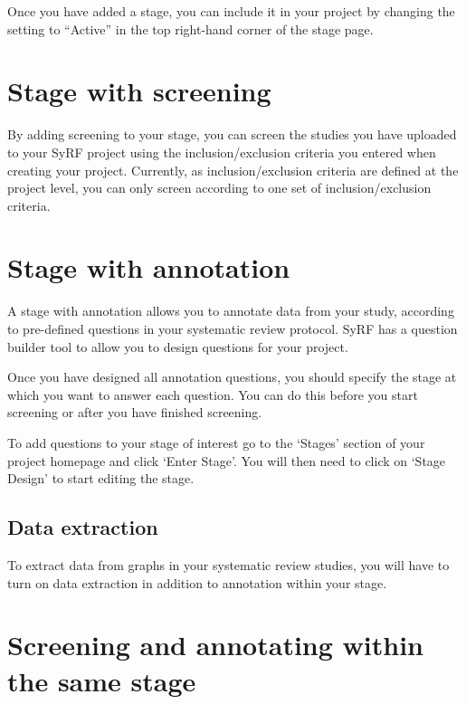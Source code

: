 \documentclass[
]{book}
\begin{document}
Once you have added a stage, you can include it in your project by changing the setting to ``Active'' in the top right-hand corner of the stage page.

\hypertarget{stage-with-screening}{%
\section{Stage with screening}\label{stage-with-screening}}

By adding screening to your stage, you can screen the studies you have uploaded to your SyRF project using the inclusion/exclusion criteria you entered when creating your project. Currently, as inclusion/exclusion criteria are defined at the project level, you can only screen according to one set of inclusion/exclusion criteria.

\hypertarget{stage-with-annotation}{%
\section{Stage with annotation}\label{stage-with-annotation}}

A stage with annotation allows you to annotate data from your study, according to pre-defined questions in your systematic review protocol. SyRF has a question builder tool to allow you to design questions for your project.

Once you have designed all annotation questions, you should specify the stage at which you want to answer each question. You can do this before you start screening or after you have finished screening.

To add questions to your stage of interest go to the `Stages' section of your project homepage and click `Enter Stage'. You will then need to click on `Stage Design' to start editing the stage.

\hypertarget{data-extraction-1}{%
\subsection{Data extraction}\label{data-extraction-1}}

To extract data from graphs in your systematic review studies, you will have to turn on data extraction in addition to annotation within your stage.

\hypertarget{screening-and-annotating-within-the-same-stage}{%
\section{Screening and annotating within the same stage}\label{screening-and-annotating-within-the-same-stage}}
\end{document}
